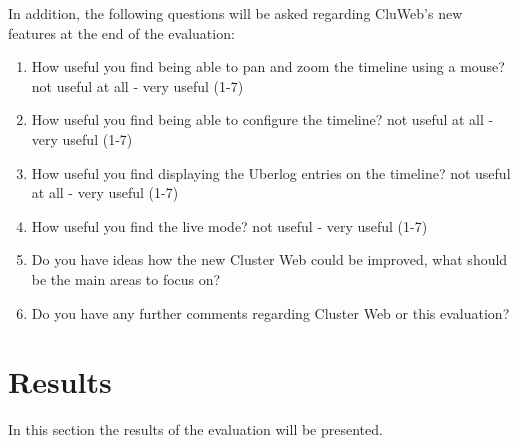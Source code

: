 In addition, the following questions will be asked regarding CluWeb's new features at the end of the evaluation:
\begin{enumerate}
\item How useful you find being able to pan and zoom the timeline using a mouse? not useful at all - very useful (1-7)
\item How useful you find being able to configure the timeline? not useful at all - very useful (1-7)
\item How useful you find displaying the Uberlog entries on the timeline? not useful at all - very useful (1-7)
\item How useful you find the live mode? not useful - very useful (1-7)
\item Do you have ideas how the new Cluster Web could be improved, what should be the main areas to focus on?
\item Do you have any further comments regarding Cluster Web or this evaluation?
\end{enumerate}

\section{Results}
In this section the results of the evaluation will be presented.


\cite{bevanevaluation, rubin2008handbook, albert2013measuring}